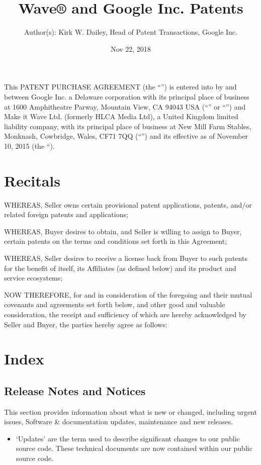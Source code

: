 \documentclass[letterpaper,10pt,english]{sphinxmanual}
\title{Wave® and Google Inc. Patents}
\date{Nov 22, 2018}
\author{Author(s): Kirk W. Dailey, Head of Patent Transactions, Google Inc.}
\begin{document}
\pagestyle{empty}
\maketitle
\pagestyle{plain}
\sphinxtableofcontents
\pagestyle{normal}
\label{\detokenize{index::doc}}


This PATENT PURCHASE AGREEMENT (the “”) is entered into by and between Google Inc. a Delaware corporation with its principal place of business at 1600 Amphitheatre Parway, Mountain View, CA 94043 USA (“” or “”) and Make it Wave Ltd. (formerly HLCA Media Ltd), a United Kingdom limited liability company, with its principal place of business at New Mill Farm Stables, Monknash, Cowbridge, Wales, CF71 7QQ (“”) and its effective as of November 10, 2015 (the “).


\chapter{Recitals}
\label{\detokenize{index:recitals}}
WHEREAS, Seller owns certain provisional patent applications, patents, and/or related foreign patents and applications;

WHEREAS, Buyer desires to obtain, and Seller is willing to assign to Buyer, certain patents on the terms and conditions set forth in this Agreement;

WHEREAS, Seller desires to receive a license back from Buyer to such patents for the benefit of itself, its Affiliates (as defined below) and its product and service ecosystems;

NOW THEREFORE, for and in consideration of the foregoing and their mutual covenants and agreements set forth below, and other good and valuable consideration, the receipt and sufficiency of which are hereby acknowledged by Seller and Buyer, the parties hereby agree as follows:


\chapter{Index}
\label{\detokenize{index:index}}

\section{Release Notes and Notices}
\label{\detokenize{releasenotes:release-notes-and-notices}}\label{\detokenize{releasenotes::doc}}
This section provides information about what is new or changed, including urgent issues, Software \& documentation updates, maintenance and new releases.
\begin{itemize}
\item {} 
‘Updates’ are the term used to describe significant changes to our public source code. These technical documents are now contained within our public source code.

\end{itemize}
\end{document}
